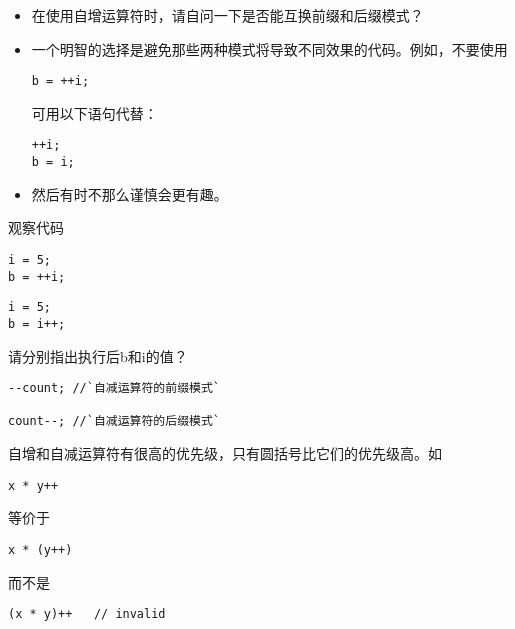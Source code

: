 \begin{frame}[fragile]
\begin{itemize}
\item
在使用自增运算符时，请自问一下是否能互换前缀和后缀模式？\\[0.1in]
\item
一个明智的选择是避免那些两种模式将导致不同效果的代码。例如，不要使用
\begin{lstlisting}[backgroundcolor=\color{red!10}]
b = ++i;
\end{lstlisting}
可用以下语句代替：
\begin{lstlisting}[backgroundcolor=\color{red!10}]
++i;
b = i;
\end{lstlisting}
\item 然后有时不那么谨慎会更有趣。
\end{itemize}
\end{frame}

\begin{frame}[fragile]
观察代码
\begin{lstlisting}[backgroundcolor=\color{red!10}]
i = 5;
b = ++i;
\end{lstlisting}
\begin{lstlisting}[backgroundcolor=\color{red!10}]
i = 5;
b = i++;
\end{lstlisting}
请分别指出执行后b和i的值？
\end{frame}

\begin{frame}[fragile]
\begin{lstlisting}[backgroundcolor=\color{red!10}]
--count; //`自减运算符的前缀模式`

count--; //`自减运算符的后缀模式`
\end{lstlisting}
\end{frame}

\begin{frame}[fragile]
自增和自减运算符有很高的优先级，只有圆括号比它们的优先级高。如
\begin{lstlisting}[backgroundcolor=\color{red!10}]
x * y++
\end{lstlisting}
等价于
\begin{lstlisting}[backgroundcolor=\color{red!10}]
x * (y++)
\end{lstlisting}
而不是
\begin{lstlisting}[backgroundcolor=\color{red!10}]
(x * y)++   // invalid
\end{lstlisting}
\end{frame}


